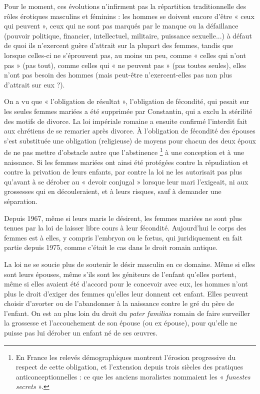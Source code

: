  Pour le moment, ces évolutions n'infirment pas la répartition traditionnelle des rôles érotiques masculins et féminins : les hommes se doivent encore d'être « ceux qui peuvent », ceux qui ne sont pas marqués par le manque ou la défaillance (pouvoir politique, financier, intellectuel, militaire, puissance sexuelle...) à défaut de quoi ils n'exercent guère d'attrait sur la plupart des femmes, tandis que lorsque celles-ci ne s'éprouvent pas, au moins un peu, comme « celles qui n'ont pas » (pas tout), comme celles qui « ne peuvent pas » (pas toutes seules), elles n'ont pas besoin des hommes (mais peut-être n'exercent-elles pas non plus d'attrait sur eux ?). 
 
 On a vu que « l'obligation de résultat », l'obligation de fécondité, qui pesait sur les seules femmes mariées a été supprimée par Constantin, qui a exclu la stérilité des motifs de divorce. La loi impériale romaine a ensuite confirmé l'interdit fait aux chrétiens de se remarier après divorce. À l'obligation de fécondité des épouses s'est substituée une obligation (religieuse) de moyens pour chacun des deux époux de ne pas mettre d'obstacle autre que l'abstinence 
\footnote{En France les relevés démographiques montrent l'érosion progressive du respect de cette obligation, et l'extension depuis trois siècles des pratiques anticonceptionnelles : ce que les anciens moralistes nommaient les « \emph{funestes secrets} ».} 
à une conception et à une naissance. Si les femmes mariées ont ainsi été protégées contre la répudiation et contre la privation de leurs enfants, par contre la loi ne les autorisait pas plus qu'avant à se dérober au « devoir conjugal » lorsque leur mari l'exigeait, ni aux grossesses qui en découleraient, et à leurs risques, sauf à demander une séparation. 

 Depuis 1967, même si leurs maris le désirent, les femmes mariées ne sont plus tenues par la loi de laisser libre cours à leur fécondité. Aujourd'hui le corps des femmes est à elles, y compris l'embryon ou le fœtus, qui juridiquement en fait partie depuis 1975, comme c'était le cas dans le droit romain antique. 

 La loi ne se soucie plus de soutenir le désir masculin en ce domaine. Même si elles sont leurs épouses, même s'ils sont les géniteurs de l'enfant qu'elles portent, même si elles avaient été d'accord pour le concevoir avec eux, les hommes n'ont plus le droit d'exiger des femmes qu'elles leur donnent cet enfant. Elles peuvent choisir d'avorter ou de l'abandonner à la naissance contre le gré du père de l'enfant. On est au plus loin du droit du \emph{pater familias} romain de faire surveiller la grossesse et l'accouchement de son épouse (ou ex épouse), pour qu'elle ne puisse pas lui dérober un enfant né de ses œuvres.

